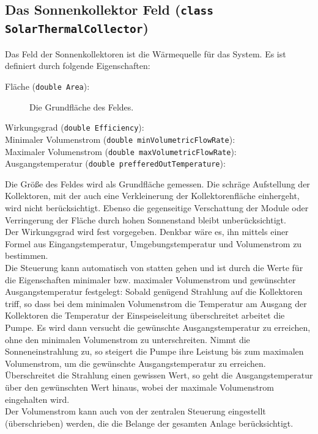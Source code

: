 \documentclass[12pt,a4paper]{article}
\begin{document}
\subsection{Das Sonnenkollektor Feld (\texttt{class SolarThermalCollector})}
Das Feld der Sonnenkollektoren ist die Wärmequelle für das System. Es ist definiert durch folgende Eigenschaften:
\begin{description}
\item[Fläche (\texttt{double Area}):] Die Grundfläche des Feldes. 
\item[Wirkungsgrad (\texttt{double Efficiency}):] 
\item[Minimaler Volumenstrom (\texttt{double minVolumetricFlowRate}):]
\item[Maximaler Volumenstrom (\texttt{double maxVolumetricFlowRate}):]
\item[Ausgangstemperatur (\texttt{double prefferedOutTemperature}):] 
\end{description}
Die Größe des Feldes wird als Grundfläche gemessen. Die schräge Aufstellung der Kollektoren, mit der auch eine Verkleinerung der Kollektorenfläche einhergeht, wird nicht berücksichtigt. Ebenso die gegenseitige Verschattung der Module oder Verringerung der Fläche durch hohen Sonnenstand bleibt unberücksichtigt. \\
Der Wirkungsgrad wird fest vorgegeben. Denkbar wäre es, ihn mittels einer Formel aus Eingangstemperatur, Umgebungstemperatur und Volumenstrom zu bestimmen.\\
Die Steuerung kann automatisch von statten gehen und ist durch die Werte für die Eigenschaften minimaler bzw. maximaler Volumenstrom und gewünschter Ausgangstemperatur festgelegt: Sobald genügend Strahlung auf die Kollektoren triff, so dass bei dem minimalen Volumenstrom die Temperatur am Ausgang der Kollektoren die Temperatur der Einspeiseleitung überschreitet arbeitet die Pumpe. Es wird dann versucht die gewünschte Ausgangstemperatur zu erreichen, ohne den minimalen Volumenstrom zu unterschreiten. Nimmt die Sonneneinstrahlung zu, so steigert die Pumpe ihre Leistung bis zum maximalen Volumenstrom, um die gewünschte Ausgangstemperatur zu erreichen. Überschreitet die Strahlung einen gewissen Wert, so geht die Ausgangstemperatur über den gewünschten Wert hinaus, wobei der maximale Volumenstrom eingehalten wird.\\
Der Volumenstrom kann auch von der zentralen Steuerung eingestellt (überschrieben) werden, die die Belange der gesamten Anlage berücksichtigt.
\end{document}
